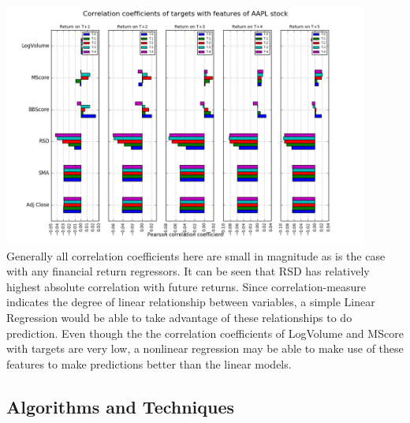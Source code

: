 \documentclass[10pt]{report}
\begin{document}
\includegraphics[width=12cm]{plots/corrcoeffs.png}\\
Generally all correlation coefficients here are small in magnitude as is the case with any financial return regressors. It can be seen that RSD has relatively highest absolute correlation with future returns. Since correlation-measure indicates the degree of linear relationship between variables, a simple Linear Regression would be able to take advantage of these relationships to do prediction. Even though the the correlation coefficients of LogVolume and MScore with targets are very low, a nonlinear regression may be able to make use of these features to make predictions better than the linear models.
\subsection*{Algorithms and Techniques}
\end{document}
